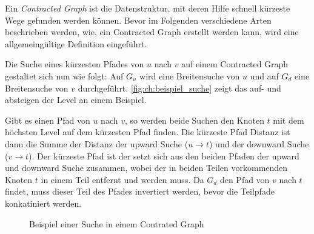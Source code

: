 Ein \emph{Contracted Graph} ist die Datenstruktur, mit deren Hilfe schnell kürzeste Wege gefunden werden können.
Bevor im Folgenden verschiedene Arten beschrieben werden, wie, ein Contracted Graph erstellt werden kann, wird eine allgemeingültige Definition eingeführt.



Die Suche eines kürzesten Pfades von $u$ nach $v$ auf einem Contracted Graph gestaltet sich nun wie folgt:
Auf $G_u$ wird eine Breitensuche von $u$ und auf $G_d$ eine Breitensuche von $v$ durchgeführt.
\autoref{fig:ch:beispiel_suche} zeigt das auf- und absteigen der Level an einem Beispiel.

Gibt es einen Pfad von $u$ nach $v$, so werden beide Suchen den Knoten $t$ mit dem höchsten Level auf dem kürzesten Pfad finden.
Die kürzeste Pfad Distanz ist dann die Summe der Distanz der upward Suche ($u \to t$) und der downward Suche ($v \to t$).
Der kürzeste Pfad ist der setzt sich aus den beiden Pfaden der upward und downward Suche zusammen, wobei der in beiden Teilen vorkommenden Knoten $t$ in einem Teil entfernt und werden muss.
Da $G_d$ den Pfad von $v$ nach $t$ findet, muss dieser Teil des Pfades invertiert werden, bevor die Teilpfade konkatiniert werden.

\begin{figure}[ht]
    \centering
    \caption{Beispiel einer Suche in einem Contrated Graph}
    \label{fig:ch:beispiel_suche}
\end{figure}


